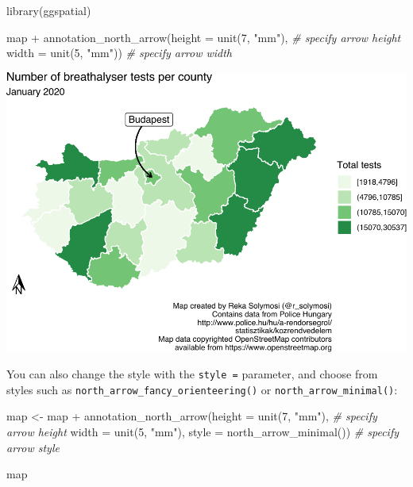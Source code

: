 \documentclass[
  krantz2]{krantz}
\makeatletter
\newenvironment{Shaded}{\begin{snugshade}}{\end{snugshade}}
\newcommand{\AttributeTok}[1]{\textcolor[rgb]{0.61,0.61,0.61}{#1}}
\newcommand{\CommentTok}[1]{\textcolor[rgb]{0.37,0.37,0.37}{\textit{#1}}}
\newcommand{\DecValTok}[1]{\textcolor[rgb]{0.06,0.06,0.06}{#1}}
\newcommand{\FunctionTok}[1]{\textcolor[rgb]{0,0,0}{#1}}
\newcommand{\NormalTok}[1]{#1}
\newcommand{\OtherTok}[1]{\textcolor[rgb]{0.37,0.37,0.37}{#1}}
\newcommand{\SpecialCharTok}[1]{\textcolor[rgb]{0,0,0}{#1}}
\newcommand{\StringTok}[1]{\textcolor[rgb]{0.5,0.5,0.5}{#1}}
\newenvironment{kframe}{%
\medskip{}
\setlength{\fboxsep}{.8em}
 \def\at@end@of@kframe{}%
 \ifinner\ifhmode%
  \def\at@end@of@kframe{\end{minipage}}%
  \begin{minipage}{\columnwidth}%
 \fi\fi%
 \def\FrameCommand##1{\hskip\@totalleftmargin \hskip-\fboxsep
 \colorbox{shadecolor}{##1}\hskip-\fboxsep
     \hskip-\linewidth \hskip-\@totalleftmargin \hskip\columnwidth}%
 \MakeFramed {\advance\hsize-\width
   \@totalleftmargin\z@ \linewidth\hsize
   \@setminipage}}%
 {\par\unskip\endMakeFramed%
 \at@end@of@kframe}
\renewenvironment{Shaded}{\begin{kframe}}{\end{kframe}}
\makeatother
\begin{document}
\begin{Shaded}
\begin{Highlighting}[]
\FunctionTok{library}\NormalTok{(ggspatial)}

\NormalTok{map }\SpecialCharTok{+} 
  \FunctionTok{annotation\_north\_arrow}\NormalTok{(}\AttributeTok{height =} \FunctionTok{unit}\NormalTok{(}\DecValTok{7}\NormalTok{, }\StringTok{"mm"}\NormalTok{), }\CommentTok{\# specify arrow height}
                         \AttributeTok{width =} \FunctionTok{unit}\NormalTok{(}\DecValTok{5}\NormalTok{, }\StringTok{"mm"}\NormalTok{)) }\CommentTok{\# specify arrow width}
\end{Highlighting}
\end{Shaded}

\includegraphics{crime_mapping_files/figure-latex/orientation-1.pdf}

You can also change the style with the \texttt{style\ =} parameter, and choose from styles such as \texttt{north\_arrow\_fancy\_orienteering()} or \texttt{north\_arrow\_minimal()}:

\begin{Shaded}
\begin{Highlighting}[]
\NormalTok{map }\OtherTok{\textless{}{-}}\NormalTok{ map }\SpecialCharTok{+} 
  \FunctionTok{annotation\_north\_arrow}\NormalTok{(}\AttributeTok{height =} \FunctionTok{unit}\NormalTok{(}\DecValTok{7}\NormalTok{, }\StringTok{"mm"}\NormalTok{), }\CommentTok{\# specify arrow height}
                         \AttributeTok{width =} \FunctionTok{unit}\NormalTok{(}\DecValTok{5}\NormalTok{, }\StringTok{"mm"}\NormalTok{), }
                        \AttributeTok{style =} \FunctionTok{north\_arrow\_minimal}\NormalTok{()) }\CommentTok{\# specify arrow style}

\NormalTok{map}
\end{Highlighting}
\end{Shaded}
\end{document}
